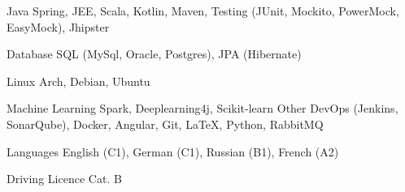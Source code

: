 

\begin{cvskills}

  \cvskill
    {Java} %
    {Spring, JEE, Scala, Kotlin, Maven, Testing (JUnit, Mockito, PowerMock, EasyMock), Jhipster} %

  \cvskill
    {Database} %
    {SQL (MySql, Oracle, Postgres), JPA (Hibernate)} %

  \cvskill
    {Linux} %
    {Arch, Debian, Ubuntu} %

  \cvskill
    {Machine Learning} %
    {Spark, Deeplearning4j, Scikit-learn} %
  \cvskill
    {Other} %
    {DevOps (Jenkins, SonarQube), Docker, Angular, Git, LaTeX, Python, RabbitMQ} %

  \cvskill
    {Languages} %
    {English (C1), German (C1), Russian (B1), French (A2)} %

  \cvskill
    {Driving Licence} %
    {Cat. B} %

\end{cvskills}
